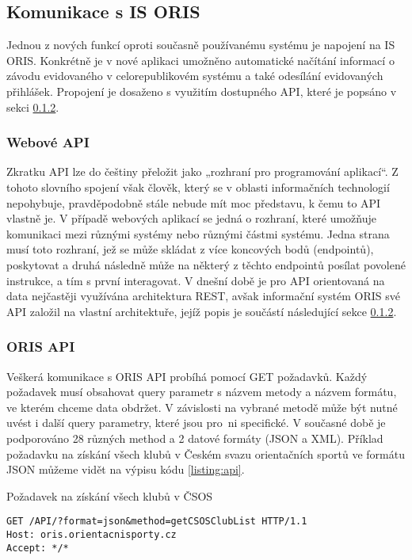 \subsection{Komunikace s IS ORIS}
Jednou z nových funkcí oproti současně používanému systému je napojení na IS ORIS. Konkrétně je v nové aplikaci umožněno automatické načítání informací o závodu evidovaného v celorepublikovém systému a také odesílání evidovaných přihlášek. Propojení je dosaženo s využitím dostupného API, které je popsáno v sekci \ref{implementation:oris-api}.

\subsubsection{Webové API}\label{implementation:api}
Zkratku API lze do češtiny přeložit jako „rozhraní pro programování aplikací“. Z tohoto slovního spojení však člověk, který se v oblasti informačních technologií nepohybuje, pravděpodobně stále nebude mít moc představu, k čemu to API vlastně je. V případě webových aplikací se jedná o rozhraní, které umožňuje komunikaci mezi různými systémy nebo různými částmi systému. Jedna strana musí toto rozhraní, jež se může skládat z více koncových bodů (endpointů), poskytovat a druhá následně může na některý z těchto endpointů posílat povolené instrukce, a tím s první interagovat. V dnešní době je pro API orientovaná na data nejčastěji využívána architektura REST, avšak informační systém ORIS své API založil na vlastní architektuře, jejíž popis je součástí následující sekce \ref{implementation:oris-api}. \cite{api}

\subsubsection{ORIS API}\label{implementation:oris-api}
Veškerá komunikace s ORIS API probíhá pomocí GET požadavků. Každý požadavek musí obsahovat query parametr s názvem metody a názvem formátu, ve kterém chceme data obdržet. V závislosti na vybrané metodě může být nutné uvést i další query parametry, které jsou pro~ni specifické. V současné době je podporováno 28 různých method a 2 datové formáty (JSON a XML). Příklad požadavku na získání všech klubů v Českém svazu orientačních sportů ve formátu JSON můžeme vidět na výpisu kódu \ref{listing:api}. 

\begin{listing}[h]
    \caption{Požadavek na získání všech klubů v ČSOS}\label{listing:api}
    \begin{verbatim}
GET /API/?format=json&method=getCSOSClubList HTTP/1.1
Host: oris.orientacnisporty.cz
Accept: */*
    \end{verbatim}
\end{listing}

